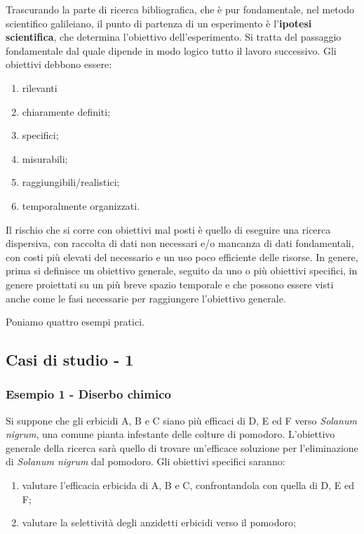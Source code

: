 \documentclass[a4paper,12pt,oneside]{book}
\providecommand{\tightlist}{%
  \setlength{\itemsep}{0pt}\setlength{\parskip}{0pt}}
\begin{document}
Trascurando la parte di ricerca bibliografica, che è pur fondamentale,
nel metodo scientifico galileiano, il punto di partenza di un
esperimento è l'\textbf{ipotesi scientifica}, che determina l'obiettivo
dell'esperimento. Si tratta del passaggio fondamentale dal quale dipende
in modo logico tutto il lavoro successivo. Gli obiettivi debbono essere:

\begin{enumerate}
\def\labelenumi{\arabic{enumi}.}
\tightlist
\item
  rilevanti
\item
  chiaramente definiti;
\item
  specifici;
\item
  misurabili;
\item
  raggiungibili/realistici;
\item
  temporalmente organizzati.
\end{enumerate}

Il rischio che si corre con obiettivi mal posti è quello di eseguire una
ricerca dispersiva, con raccolta di dati non necessari e/o mancanza di
dati fondamentali, con costi più elevati del necessario e un uso poco
efficiente delle risorse. In genere, prima si definisce un obiettivo
generale, seguito da uno o più obiettivi specifici, in genere proiettati
su un più breve spazio temporale e che possono essere visti anche come
le fasi necessarie per raggiungere l'obiettivo generale.

Poniamo quattro esempi pratici.

\subsection{Casi di studio - 1}\label{casi-di-studio---1}

\subsubsection{Esempio 1 - Diserbo
chimico}\label{esempio-1---diserbo-chimico}

Si suppone che gli erbicidi A, B e C siano più efficaci di D, E ed F
verso \emph{Solanum nigrum}, una comune pianta infestante delle colture
di pomodoro. L'obiettivo generale della ricerca sarà quello di trovare
un'efficace soluzione per l'eliminazione di \emph{Solanum nigrum} dal
pomodoro. Gli obiettivi specifici saranno:

\begin{enumerate}
\def\labelenumi{\arabic{enumi}.}
\tightlist
\item
  valutare l'efficacia erbicida di A, B e C, confrontandola con quella
  di D, E ed F;
\item
  valutare la selettività degli anzidetti erbicidi verso il pomodoro;
\end{enumerate}
\end{document}
